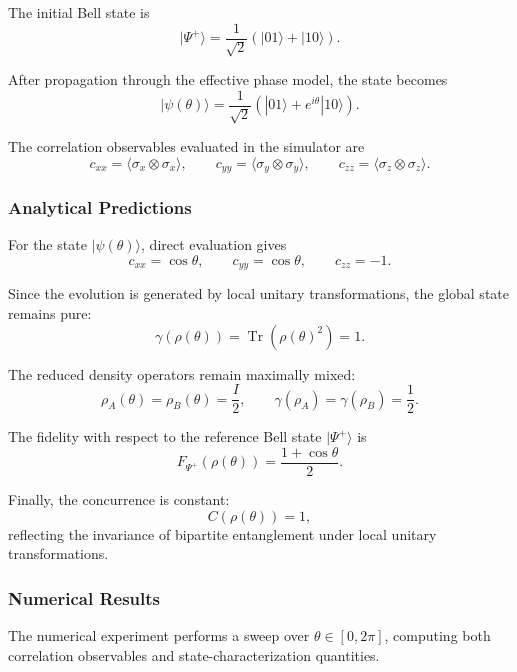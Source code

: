 \documentclass[a4paper]{article}
\begin{document}
The initial Bell state is
\[
|\Psi^{+}\rangle
=
\frac{1}{\sqrt{2}}
\left(
|01\rangle + |10\rangle
\right).
\]

After propagation through the effective phase model, the state becomes
\[
|\psi(\theta)\rangle
=
\frac{1}{\sqrt{2}}
\left(
|01\rangle + e^{i\theta}|10\rangle
\right).
\]

The correlation observables evaluated in the simulator are
\[
c_{xx} = \langle \sigma_x \otimes \sigma_x \rangle,\qquad
c_{yy} = \langle \sigma_y \otimes \sigma_y \rangle,\qquad
c_{zz} = \langle \sigma_z \otimes \sigma_z \rangle.
\]


\subsubsection{Analytical Predictions}

For the state \( |\psi(\theta)\rangle \), direct evaluation gives
\[
c_{xx} = \cos\theta,\qquad
c_{yy} = \cos\theta,\qquad
c_{zz} = -1.
\]

Since the evolution is generated by local unitary transformations, the global state remains pure:
\[
\gamma(\rho(\theta))
=
\operatorname{Tr}\!\left(\rho(\theta)^2\right)
=
1.
\]

The reduced density operators remain maximally mixed:
\[
\rho_A(\theta)=\rho_B(\theta)=\frac{I}{2},
\qquad
\gamma(\rho_A)=\gamma(\rho_B)=\frac{1}{2}.
\]

The fidelity with respect to the reference Bell state \( |\Psi^+\rangle \) is
\[
F_{\Psi^+}(\rho(\theta))
=
\frac{1+\cos\theta}{2}.
\]

Finally, the concurrence is constant:
\[
C(\rho(\theta)) = 1,
\]
reflecting the invariance of bipartite entanglement under local unitary transformations.


\subsubsection{Numerical Results}

The numerical experiment performs a sweep over \( \theta \in [0,2\pi] \), computing both correlation observables and state-characterization quantities.
\end{document}
